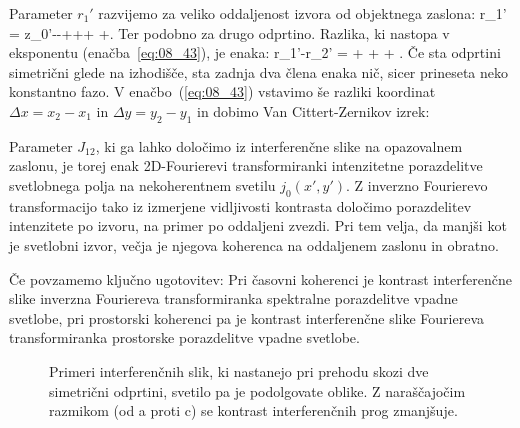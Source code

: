 Parameter $r_1'$ razvijemo za veliko oddaljenost izvora od objektnega zaslona:
\beq
r_1' =  \approx
z_0'--+++
+.
\label{eq:08_44}
\eeq
Ter podobno za drugo odprtino. 
Razlika, ki nastopa v eksponentu (enačba~\ref{eq:08_43}), je enaka:
\beq
r_1'-r_2' = +
+  + .
\label{eq:08_46}
\eeq
Če sta odprtini simetrični glede na izhodišče, sta zadnja dva člena
enaka nič, sicer prineseta neko konstantno fazo. V enačbo~(\ref{eq:08_43}) vstavimo 
še razliki koordinat
$\Delta x = x_2-x_1$ in $\Delta y = y_2-y_1$ in dobimo Van Cittert-Zernikov izrek:

Parameter $J_{12}$, ki ga lahko določimo iz interferenčne slike na opazovalnem zaslonu,
je torej enak 2D-Fourierevi transformiranki intenzitetne porazdelitve svetlobnega polja 
na nekoherentnem svetilu $j_0(x',y')$. Z inverzno Fourierevo transformacijo tako iz izmerjene vidljivosti
kontrasta določimo porazdelitev intenzitete po izvoru, na primer po oddaljeni zvezdi. 
Pri tem velja, da manjši kot je svetlobni izvor, večja je njegova koherenca na oddaljenem 
zaslonu in obratno.

Če povzamemo ključno ugotovitev: Pri časovni koherenci je kontrast interferenčne slike
inverzna Fouriereva transformiranka spektralne porazdelitve vpadne svetlobe, pri prostorski
koherenci pa je kontrast interferenčne slike Fouriereva transformiranka prostorske porazdelitve vpadne svetlobe.
\begin{figure}[h]
\centering
\def\svgwidth{140truemm} 

\caption{Primeri interferenčnih slik, ki nastanejo pri prehodu skozi dve simetrični odprtini, svetilo
pa je podolgovate oblike. Z naraščajočim razmikom (od a proti c) se kontrast interferenčnih prog zmanjšuje.}
\label{fig:08_VCZ_slika}
\end{figure}

